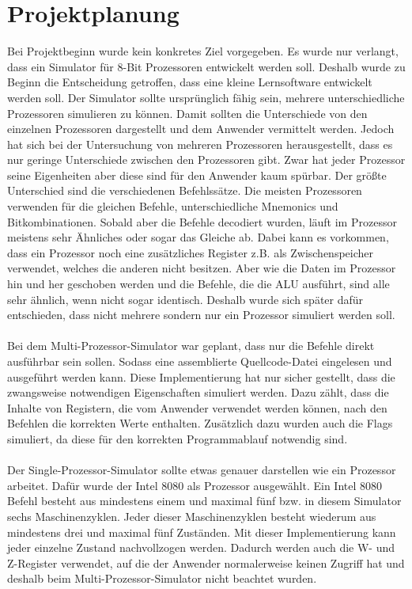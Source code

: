 \documentclass[12pt]{article}
\begin{document}
\section{Projektplanung}
Bei Projektbeginn wurde kein konkretes Ziel vorgegeben. Es wurde nur verlangt, dass ein Simulator für 8-Bit Prozessoren entwickelt werden soll. Deshalb wurde zu Beginn die Entscheidung getroffen, dass eine kleine Lernsoftware entwickelt werden soll. Der Simulator sollte ursprünglich fähig sein, mehrere unterschiedliche Prozessoren simulieren zu können. Damit sollten die Unterschiede von den einzelnen Prozessoren dargestellt und dem Anwender vermittelt werden. Jedoch hat sich bei der Untersuchung von mehreren Prozessoren herausgestellt, dass es nur geringe Unterschiede zwischen den Prozessoren gibt. Zwar hat jeder Prozessor seine Eigenheiten aber diese sind für den Anwender kaum spürbar. Der größte Unterschied sind die verschiedenen Befehlssätze. Die meisten Prozessoren verwenden für die gleichen Befehle, unterschiedliche Mnemonics und Bitkombinationen. Sobald aber die Befehle decodiert wurden, läuft im Prozessor meistens sehr Ähnliches oder sogar das Gleiche ab. Dabei kann es vorkommen, dass ein Prozessor noch eine zusätzliches Register z.B. als Zwischenspeicher verwendet, welches die anderen nicht besitzen. Aber wie die Daten im Prozessor hin und her geschoben werden und die Befehle, die die ALU ausführt, sind alle sehr ähnlich, wenn nicht sogar identisch. Deshalb wurde sich später dafür entschieden, dass nicht mehrere sondern nur ein Prozessor simuliert werden soll.
\\\\
Bei dem Multi-Prozessor-Simulator war geplant, dass nur die Befehle direkt ausführbar sein sollen. Sodass eine assemblierte Quellcode-Datei eingelesen und ausgeführt werden kann. Diese Implementierung hat nur sicher gestellt, dass die zwangsweise notwendigen Eigenschaften simuliert werden. Dazu zählt, dass die Inhalte von Registern, die vom Anwender verwendet werden können, nach den Befehlen die korrekten Werte enthalten. Zusätzlich dazu wurden auch die Flags simuliert, da diese für den korrekten Programmablauf notwendig sind. 
\\\\
Der Single-Prozessor-Simulator sollte etwas genauer darstellen wie ein Prozessor arbeitet. Dafür wurde der Intel 8080 als Prozessor ausgewählt. Ein Intel 8080 Befehl besteht aus mindestens einem und maximal fünf bzw. in diesem Simulator sechs Maschinenzyklen. Jeder dieser Maschinenzyklen besteht wiederum aus mindestens drei und maximal fünf Zuständen. Mit dieser Implementierung kann jeder einzelne Zustand nachvollzogen werden. Dadurch werden auch die W- und Z-Register verwendet, auf die der Anwender normalerweise keinen Zugriff hat und deshalb beim Multi-Prozessor-Simulator nicht beachtet wurden.
\end{document}

